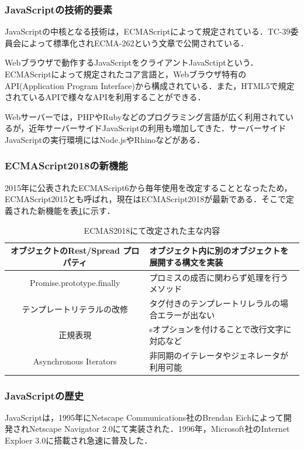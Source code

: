 \documentclass[a4j,12pt]{jsarticle}
\begin{document}
\subsubsection{JavaScriptの技術的要素}
JavaScriptの中核となる技術は，ECMAScriptによって規定されている．TC-39委員会によって標準化されECMA-262という文章で公開されている．

Webブラウザで動作するJavaScriptをクライアントJavaSctiptという．ECMAScriptによって規定されたコア言語と，Webブラウザ特有のAPI(Application Program Interface)から構成されている．また，HTML5で規定されているAPIで様々なAPIを利用することができる．

Webサーバーでは，PHPやRubyなどのプログラミング言語が広く利用されているが，近年サーバーサイドJavaScriptの利用も増加してきた．サーバーサイドJavaScriptの実行環境にはNode.jsやRhinoなどがある．

\subsubsection{ECMAScript2018の新機能}
2015年に公表されたECMAScript6から毎年使用を改定することとなったため，ECMAScript2015とも呼ばれ，現在はECMAScript2018が最新である．そこで定義された新機能を表\ref{tab:EC2018}に示す．

\begin{table} [h]
\centering
\caption{ECMAS2018にて改定された主な内容}
	\begin{tabular} {| c | l |} \hline
	オブジェクトのRest/Spread プロパティ &  オブジェクト内に別のオブジェクトを展開する構文を実装\\ \hline
	Promise.prototype.finally &  プロミスの成否に関わらず処理を行うメソッド\\ \hline
	テンプレートリテラルの改修 &  タグ付きのテンプレートリレラルの場合エラーが出ない\\ \hline
	正規表現 & sオプションを付けることで改行文字に対応など \\ \hline
	Asynchronous Iterators & 非同期のイテレータやジェネレータが利用可能 \\ \hline
	\end{tabular} 
	\label{tab:EC2018}
\end{table}

\subsubsection{JavaScriptの歴史}
JavaScriptは，1995年にNetscape Communications社のBrendan Eichによって開発されNetscape Navigator 2.0にて実装された．1996年，Microsoft社のInternet Exploer 3.0に搭載され急速に普及した．
\end{document}
